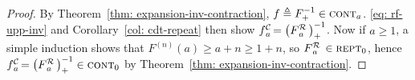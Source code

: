 \begin{proof}
	By Theorem~\ref{thm: expansion-inv-contraction}, $f\triangleq F^{-1}_+ \in \text{\scshape{cont}}_a$. 
	\eqref{eq: rf-upp-inv} and Corollary~\ref{col: cdt-repeat}
	then show $\cdt{f}{a}\ = \left(\rf{F}{a}\ \right)^{-1}_+$.
	Now if $a\ge 1$, a simple induction shows that $F^{(n)}(a)\ge a + n\ge 1 + n$, so $\rf{F}{a}\ \in \repeatable_0$, hence $\cdt{f}{a} \ = \left(\rf{F}{a}\ \right)^{-1}_+ \in \contract_0$ by Theorem~\ref{thm: expansion-inv-contraction}.
\end{proof}

